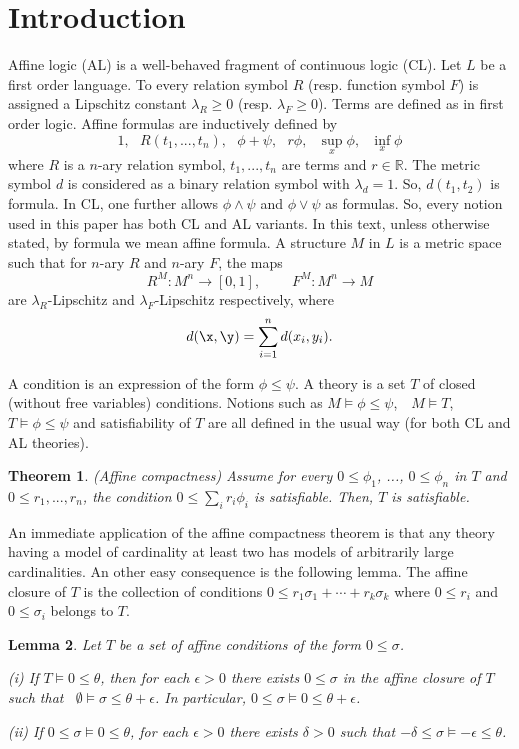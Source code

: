 \documentclass[12pt]{article}
\newtheorem{theorem}{Theorem}[section]
\newtheorem{lemma}[theorem]{Lemma}
\def\Rn{\mathbb R}
\begin{document}
\section{Introduction}
Affine logic (AL) is a well-behaved fragment of continuous logic (CL).
Let $L$ be a first order language. To every relation symbol $R$ (resp. function symbol $F$)
is assigned a Lipschitz constant $\lambda_R\geqslant0$ (resp. $\lambda_F\geqslant0$).
Terms are defined as in first order logic. Affine formulas are inductively defined by
$$1,\ \ \ R(t_1,...,t_n),\ \ \ \phi+\psi,\ \ \ r\phi,\ \ \ \sup_x\phi,\ \ \ \inf_x\phi$$
where $R$ is a $n$-ary relation symbol, $t_1,...,t_n$ are terms and $r\in\Rn$.
The metric symbol $d$ is considered as a binary relation symbol with $\lambda_d=1$. So, $d(t_1,t_2)$ is formula.
In CL, one further allows $\phi\wedge\psi$ and $\phi\vee\psi$ as formulas.
So, every notion used in this paper has both CL and AL variants.
In this text, unless otherwise stated, by formula we mean affine formula.
A structure $M$ in $L$ is a metric space such that for $n$-ary $R$ and $n$-ary $F$, the maps
$$R^M:M^n\rightarrow[0,1],\ \ \ \ \ \ \ \ \ \ F^M:M^n\rightarrow M$$
are $\lambda_R$-Lipschitz and $\lambda_F$-Lipschitz respectively, where
$$d(\x,\y)=\sum_{i=1}^nd(x_i,y_i).$$

A condition is an expression of the form $\phi\leqslant\psi$.
A theory is a set $T$ of closed (without free variables) conditions.
Notions such as $M\vDash\phi\leqslant\psi$,\ \ $M\vDash T$,\ \ $T\vDash\phi\leqslant\psi$
and satisfiability of $T$ are all defined in the usual way (for both CL and AL theories).

\begin{theorem}
(Affine compactness) Assume for every $0\leqslant\phi_1$, ..., $0\leqslant\phi_n$ in $T$ and
$0\leqslant r_1,...,r_n$, the condition $0\leqslant\sum_ir_i\phi_i$ is satisfiable. Then, $T$ is satisfiable.
\end{theorem}

An immediate application of the affine compactness theorem is that any theory having a model of cardinality
at least two has models of arbitrarily large cardinalities. An other easy consequence is the following lemma.
The affine closure of $T$ is the collection of conditions $0\leqslant r_1\sigma_1+\cdots+r_k\sigma_k$
where $0\leqslant r_i$ and $0\leqslant\sigma_i$ belongs to $T$.

\begin{lemma} \label{proofs}
Let $T$ be a set of affine conditions of the form $0\leqslant\sigma$.

\emph{(i)} If $T\vDash0\leqslant\theta$, then for each $\epsilon>0$ there exists
$0\leqslant\sigma$ in the affine closure of $T$ such that \ $\emptyset\vDash\sigma\leqslant\theta+\epsilon$.
In particular, $0\leqslant\sigma\vDash0\leqslant\theta+\epsilon$.

\emph{(ii)} If $0\leqslant\sigma\vDash0\leqslant\theta$, for each $\epsilon>0$ there exists
$\delta>0$ such that $-\delta\leqslant\sigma\vDash-\epsilon\leqslant\theta$.
\end{lemma}
\end{document}
